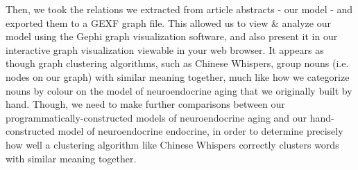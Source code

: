Then, we took the relations we extracted from article abstracts - our model - and exported them to a GEXF graph file.
This allowed us to view \& analyze our model using the Gephi graph visualization software, and also present it in our interactive graph
visualization viewable in your web browser. It appears as though graph clustering algorithms, such as Chinese Whispers, group
nouns (i.e. nodes on our graph) with similar meaning together, much like how we categorize nouns by colour on the model of neuroendocrine
aging that we originally built by hand. Though, we need to make further comparisons between our programmatically-constructed
models of neuroendocrine aging and our hand-constructed model of neuroendocrine endocrine, in order to determine precisely how well a
clustering algorithm like Chinese Whispers correctly clusters words with similar meaning together.
